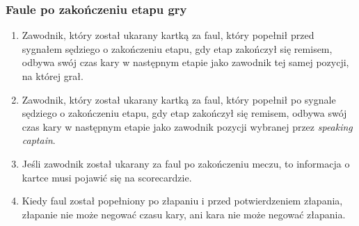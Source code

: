 \documentclass[11pt,a4paper]{article}
\begin{document}
\subsubsection{Faule po zakończeniu etapu gry}
\begin{enumerate}
  \item Zawodnik, który został ukarany kartką za faul, który popełnił przed sygnałem sędziego o zakończeniu etapu, gdy etap zakończył się remisem, odbywa swój czas kary w następnym etapie jako zawodnik tej samej pozycji, na której grał.
  \item Zawodnik, który został ukarany kartką za faul, który popełnił po sygnale sędziego o zakończeniu etapu, gdy etap zakończył się remisem, odbywa swój czas kary w następnym etapie jako zawodnik pozycji wybranej przez \emph{speaking captain}.
  \item Jeśli zawodnik został ukarany za faul po zakończeniu meczu, to informacja o kartce musi pojawić się na scorecardzie.
  \item Kiedy faul został popełniony po złapaniu i przed potwierdzeniem złapania, złapanie nie może negować czasu kary, ani kara nie może negować złapania.
\end{enumerate}

%
%
%
%
%
%

\newpage
\end{document}
